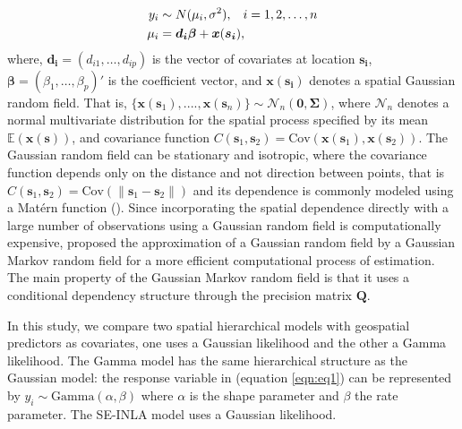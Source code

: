 \documentclass{article}
\begin{document}
\begin{align}
y_i & \sim N(\mu_i, \sigma^2), \hspace{3mm} i = 1, 2, \ldots, n \label{eqn:eq1}\\
\mu_i & = \boldsymbol{d_i \beta} + \boldsymbol{x}(\boldsymbol{s_i}), \label{eqn:eq2}
\end{align}
where, $\boldsymbol{d_i} = (d_{i1}, \ldots, d_{ip})$ is the vector of covariates at location $\boldsymbol{s_i}$, $\boldsymbol{\beta}=(\beta_1, \ldots, \beta_p)'$ is the coefficient vector, and $\boldsymbol{x}(\boldsymbol{s_i})$ denotes a spatial Gaussian random field. That is, $\{\boldsymbol{x}(\boldsymbol{s}_{1}),...., \boldsymbol{x}(\boldsymbol{s}_{n})\} \sim \mathcal{N}_{n}(\boldsymbol{0}, \boldsymbol{\Sigma})$, where $\mathcal{N}_{n}$ denotes a normal multivariate distribution for the spatial process specified by its mean $\mathbb{E}(\boldsymbol{x}(\boldsymbol{s}))$, and covariance function $C(\boldsymbol{s}_{1}, \boldsymbol{s}_{2}) = \text{Cov}(\boldsymbol{x}(\boldsymbol{s}_{1}), \boldsymbol{x}(\boldsymbol{s}_{2}))$. The Gaussian random field can be stationary and isotropic, where the covariance function depends only on the distance and not direction between points, that is $C(\boldsymbol{s}_{1}, \boldsymbol{s}_{2}) = \text{Cov}(\|\boldsymbol{s}_{1} - \boldsymbol{s}_{2}\|)$ and its dependence is commonly modeled using a Matérn function (\cite{stein2012interpolation, yuan2011models, diggleetal2013}). Since incorporating the spatial dependence directly with a large number of observations using a Gaussian random field is computationally expensive, \cite{rue2005gaussian} proposed the approximation of a Gaussian random field by a Gaussian Markov random field for a more efficient computational process of estimation. The main property of the Gaussian Markov random field is that it uses a conditional dependency structure through the precision matrix $\boldsymbol{Q}$. 




In this study, we compare two spatial hierarchical  models with geospatial predictors as covariates, one uses a Gaussian likelihood and the other a Gamma likelihood. The Gamma model has the same hierarchical structure as the Gaussian model: the response variable in (equation \ref{eqn:eq1}) can be represented by $y_{i} \sim \text{Gamma}(\alpha, \beta)$ where $\alpha$ is the shape parameter and $\beta$ the rate parameter. The SE-INLA model uses a Gaussian likelihood.
\end{document}
